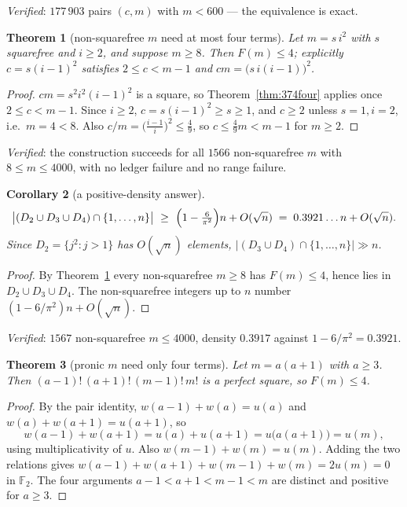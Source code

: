\documentclass[11pt]{article}
\newtheorem{theorem}{Theorem}
\newtheorem{corollary}[theorem]{Corollary}
\begin{document}
\emph{Verified}: $177\,903$ pairs $(c,m)$ with $m<600$ --- the equivalence is exact.

\begin{theorem}[non-squarefree $m$ need at most four terms]\label{thm:374nsf}
Let $m=s\,i^{2}$ with $s$ squarefree and $i\ge2$, and suppose $m\ge8$.  Then
$F(m)\le4$; explicitly $c=s(i-1)^{2}$ satisfies $2\le c<m-1$ and $cm=\bigl(s\,i(i-1)\bigr)^{2}$.
\end{theorem}

\begin{proof}
$cm=s^{2}i^{2}(i-1)^{2}$ is a square, so Theorem~\ref{thm:374four} applies once
$2\le c<m-1$.  Since $i\ge2$, $c=s(i-1)^{2}\ge s\ge1$, and $c\ge2$ unless $s=1,i=2$, i.e.\
$m=4<8$.  Also $c/m=\bigl(\tfrac{i-1}{i}\bigr)^{2}\le\tfrac49$, so $c\le\tfrac49m<m-1$ for
$m\ge2$.
\end{proof}

\emph{Verified}: the construction succeeds for all $1566$ non-squarefree $m$ with
$8\le m\le4000$, with no ledger failure and no range failure.

\begin{corollary}[a positive-density answer]\label{cor:374density}
\[
  \bigl|(D_2\cup D_3\cup D_4)\cap\{1,\dots,n\}\bigr|\ \ge\ \Bigl(1-\tfrac{6}{\pi^{2}}\Bigr)n+O(\sqrt n)
  \;=\;0.3921\ldots n+O(\sqrt n).
\]
Since $D_2=\{j^{2}:j>1\}$ has $O(\sqrt n)$ elements, $|(D_3\cup D_4)\cap\{1,\dots,n\}|\gg n$.
\end{corollary}

\begin{proof}
By Theorem~\ref{thm:374nsf} every non-squarefree $m\ge8$ has $F(m)\le4$, hence lies in
$D_2\cup D_3\cup D_4$.  The non-squarefree integers up to $n$ number
$(1-6/\pi^{2})n+O(\sqrt n)$.
\end{proof}

\emph{Verified}: $1567$ non-squarefree $m\le4000$, density $0.3917$ against
$1-6/\pi^{2}=0.3921$.

\begin{theorem}[pronic $m$ need only four terms]\label{thm:374pronic}
Let $m=a(a+1)$ with $a\ge3$.  Then $(a{-}1)!\,(a{+}1)!\,(m{-}1)!\,m!$ is a perfect square,
so $F(m)\le4$.
\end{theorem}

\begin{proof}
By the pair identity, $w(a{-}1)+w(a)=u(a)$ and $w(a)+w(a{+}1)=u(a{+}1)$, so
\[
  w(a{-}1)+w(a{+}1)=u(a)+u(a{+}1)=u\bigl(a(a{+}1)\bigr)=u(m),
\]
using multiplicativity of $u$.  Also $w(m{-}1)+w(m)=u(m)$.  Adding the two relations gives
$w(a{-}1)+w(a{+}1)+w(m{-}1)+w(m)=2u(m)=0$ in $\mathbb F_2$.  The four arguments
$a{-}1<a{+}1<m{-}1<m$ are distinct and positive for $a\ge3$.
\end{proof}
\end{document}
